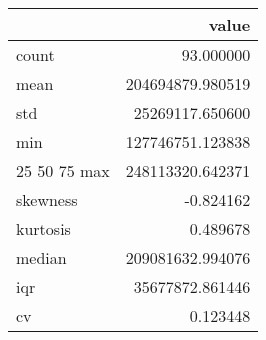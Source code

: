 \begin{tabular}{lr}
\toprule
 & value \\
\midrule
count & 93.000000 \\
mean & 204694879.980519 \\
std & 25269117.650600 \\
min & 127746751.123838 \\
25%
50%
75%
max & 248113320.642371 \\
skewness & -0.824162 \\
kurtosis & 0.489678 \\
median & 209081632.994076 \\
iqr & 35677872.861446 \\
cv & 0.123448 \\
\bottomrule
\end{tabular}

